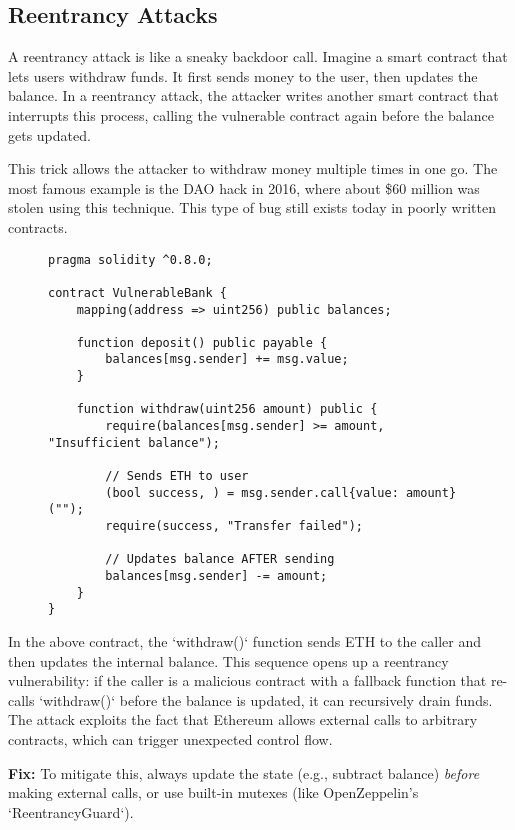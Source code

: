 \documentclass[conference]{IEEEtran}
\begin{document}
\subsection{Reentrancy Attacks}

A reentrancy attack is like a sneaky backdoor call. Imagine a smart contract that lets users withdraw funds. It first sends money to the user, then updates the balance. In a reentrancy attack, the attacker writes another smart contract that interrupts this process, calling the vulnerable contract again before the balance gets updated.

This trick allows the attacker to withdraw money multiple times in one go. The most famous example is the DAO hack in 2016, where about \$60 million was stolen using this technique. This type of bug still exists today in poorly written contracts.

\begin{figure}[H]
\begin{lstlisting}[caption=Simplified vulnerable contract in Solidity]
pragma solidity ^0.8.0;

contract VulnerableBank {
    mapping(address => uint256) public balances;

    function deposit() public payable {
        balances[msg.sender] += msg.value;
    }

    function withdraw(uint256 amount) public {
        require(balances[msg.sender] >= amount, "Insufficient balance");

        // Sends ETH to user
        (bool success, ) = msg.sender.call{value: amount}("");
        require(success, "Transfer failed");

        // Updates balance AFTER sending
        balances[msg.sender] -= amount;
    }
}
\end{lstlisting}
\end{figure}

In the above contract, the `withdraw()` function sends ETH to the caller and then updates the internal balance. This sequence opens up a reentrancy vulnerability: if the caller is a malicious contract with a fallback function that re-calls `withdraw()` before the balance is updated, it can recursively drain funds. The attack exploits the fact that Ethereum allows external calls to arbitrary contracts, which can trigger unexpected control flow.

\textbf{Fix:} To mitigate this, always update the state (e.g., subtract balance) \emph{before} making external calls, or use built-in mutexes (like OpenZeppelin's `ReentrancyGuard`).
\end{document}
